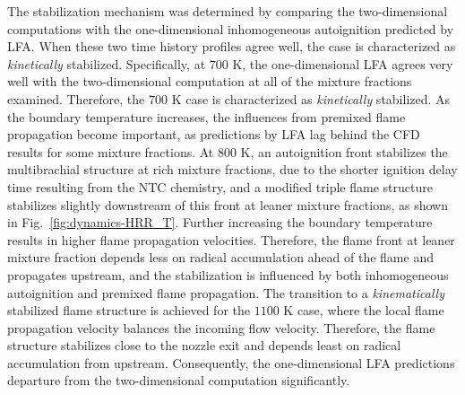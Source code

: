 The stabilization mechanism was determined by comparing the two-dimensional computations with the one-dimensional inhomogeneous autoignition predicted by LFA.  When these two time history profiles agree well, the case is characterized as \emph{kinetically} stabilized.  Specifically, at $700$ K, the one-dimensional LFA agrees very well with the two-dimensional computation at all of the mixture fractions examined.  Therefore, the $700$ K case is characterized as \emph{kinetically} stabilized.  As the boundary temperature increases, the influences from premixed flame propagation become important, as predictions by LFA lag behind the CFD results for some mixture fractions.  At $800$ K, an autoignition front stabilizes the multibrachial structure at rich mixture fractions, due to the shorter ignition delay time resulting from the NTC chemistry, and a modified triple flame structure stabilizes slightly downstream of this front at leaner mixture fractions, as shown in Fig.~\ref{fig:dynamics-HRR_T}.  Further increasing the boundary temperature results in higher flame propagation velocities.  Therefore, the flame front at leaner mixture fraction depends less on radical accumulation ahead of the flame and propagates upstream, and the stabilization is influenced by both inhomogeneous autoignition and premixed flame propagation.  The transition to a \emph {kinematically} stabilized flame structure is achieved for the $1100$ K case, where the local flame propagation velocity balances the incoming flow velocity.  Therefore, the flame structure stabilizes close to the nozzle exit and depends least on radical accumulation from upstream.  Consequently, the one-dimensional LFA predictions departure from the two-dimensional computation significantly.


